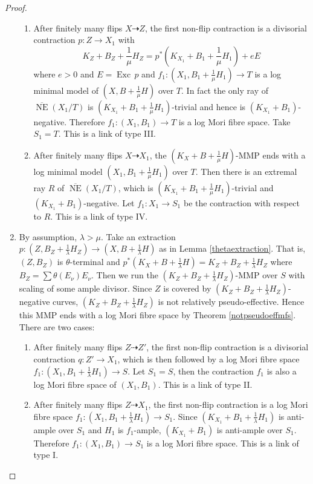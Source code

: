 \documentclass[11pt]{amsart}
\begin{document}
\begin{proof}
\begin{enumerate}
\begin{enumerate}
    \item \label{a3}
      After finitely many flips $ X\dashrightarrow Z $, the first non-flip contraction is a divisorial contraction $ p:Z\to X_1$ with 
    \[ K_Z+B_Z+\frac{1}{\mu}H_Z=p^*(K_{X_1}+B_1+\frac{1}{\mu}H_1)+eE \]
    where $ e>0 $ and  $E=\operatorname{Exc}\,p$ and  $f_{1}: (X_1,B_1+\frac{1}{\mu}H_1) \to T$ is a log minimal model of $(X,B+\frac{1}{\mu}H)$ over $T$. In fact the only ray of $ \overline{\operatorname{NE}}(X_1/T) $ is $ (K_{X_1}+B_1+\frac{1}{\mu}H_1) $-trivial and hence is $ (K_{X_1}+B_1) $-negative. Therefore $ f_1:(X_1,B_1)\to T $ is a log Mori fibre space. Take $ S_1=T $. This is a link of type III.
  \item \label{a4}After finitely many flips $ X\dashrightarrow X_1 $, the $(K_{X}+B+\frac{1}{\mu}H)$-MMP ends with a log minimal model $ (X_1,B_1+\frac{1}{\mu}H_1) $ over $T $. Then there is an extremal ray $R$ of $ \overline{\operatorname{NE}}(X_1/T) $, which is $ (K_{X_1}+B_1+\frac{1}{\mu}H_1) $-trivial and $ (K_{X_1}+B_1) $-negative. Let $ f_1:X_1\to S_1 $ be the contraction with respect to $R$. This is a link of type IV.
  \end{enumerate}
\item\label{b}By assumption, $\lambda>\mu$. Take  an extraction $ p:(Z,B_Z+\frac{1}{\lambda}H_Z)\to (X,B+\frac{1}{\lambda}H) $ as in Lemma \ref{thetaextraction}. That is,  $ (Z,B_Z) $ is $ \theta $-terminal and $ p^*(K_X+B+\frac{1}{\lambda}H)=K_Z+B_Z+\frac{1}{\lambda}H_Z $ where $ B_Z=\sum\theta(E_\nu)E_\nu $.
  Then we run the $ (K_Z+B_Z+\frac{1}{\lambda}H_Z) $-MMP over $ S $ with scaling of some ample divisor. Since $Z$ is covered by $ (K_Z+B_Z+\frac{1}{\lambda}H_Z) $-negative curves, $ (K_Z+B_Z+\frac{1}{\lambda}H_Z) $ is not relatively pseudo-effective. Hence this MMP ends with a log Mori fibre space by Theorem \ref{notpseudoeffmfs}. There are two cases:
  \begin{enumerate}
    \item \label{b1}After finitely many flips $ Z\dashrightarrow Z' $, the first non-flip contraction is a divisorial contraction $ q:Z'\to X_1 $, which is then followed by a log Mori fibre space   $f_1:(X_1,B_1+\frac{1}{\lambda}H_1)\to S$. Let $ S_1=S $, then the contraction  $f_1$ is also a log Mori fibre space of $(X_1,B_1)$. This is a link of type II.
    \item\label{b2}After finitely many flips $ Z\dashrightarrow X_1 $, the first non-flip contraction is a log Mori fibre space  $f_1:(X_1,B_1+\frac{1}{\lambda}H_1)\to S_1$. Since $ (K_{X_1}+B_1+\frac{1}{\lambda}H_1) $ is anti-ample over $S_1$ and $ H_1 $ is $ f_1 $-ample, $(K_{X_1}+B_1) $ is anti-ample over $S_1$. Therefore $ f_1:(X_1,B_1)\to S_1 $ is a log Mori fibre space. This is a link of type I.
  \end{enumerate} 
\end{enumerate}
\end{proof}
\end{document}
